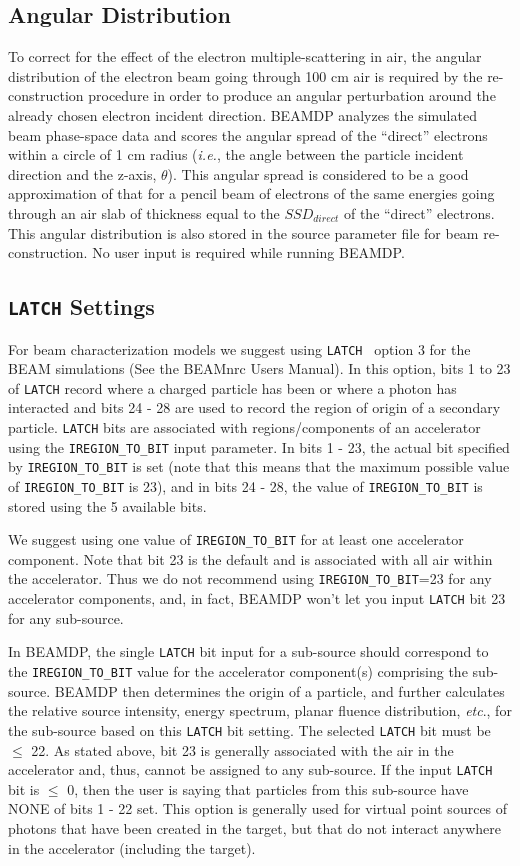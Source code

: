 \documentclass[12pt,twoside]{article}
\newcommand{\etc}{{\em etc}}
\newcommand{\ie}{{\em i.e.}}
\begin{document}
\subsection{Angular Distribution}
To correct for the effect of the electron multiple-scattering in air, the
angular distribution of the electron beam going through 100 cm air is
required by the re-construction procedure in order to produce an angular
perturbation around the already chosen electron incident direction. BEAMDP
analyzes the simulated beam phase-space data and scores the angular
spread  of the ``direct'' electrons within a circle of 1 cm radius (\ie,
the angle between the particle incident direction and the z-axis,
$\theta$). This angular spread is considered to be a good approximation of
that for a pencil beam of electrons of the same energies going through an
air slab of thickness equal to the $SSD_{direct}$ of the ``direct''
electrons. This angular distribution is also stored in the source
parameter file for beam re-construction.  No user input is required while
running BEAMDP.

\subsection{{\tt LATCH} Settings}
For beam characterization models we suggest using {\tt LATCH } option 3
for the BEAM simulations (See the BEAMnrc Users Manual\cite{Ro04a}).
In this option, bits 1 to 23 of {\tt LATCH} record where a charged particle
has been or where a photon has interacted and bits 24 - 28 are used to record
the region of origin of a secondary particle.  {\tt LATCH} bits are associated
with
regions/components of an accelerator using the {\tt IREGION\_TO\_BIT}
input parameter.  In bits 1 - 23, the actual bit specified by
{\tt IREGION\_TO\_BIT} is set (note that this means that the maximum
possible value of {\tt IREGION\_TO\_BIT} is 23), and in bits 24 - 28, the value of
{\tt IREGION\_TO\_BIT} is stored using the 5 available bits.

We suggest using one value of
{\tt IREGION\_TO\_BIT} for at
least one accelerator component.  Note that bit 23 is the default and
is associated with all air within the accelerator.  Thus we do not
recommend using {\tt IREGION\_TO\_BIT}=23 for any accelerator components, and,
in fact, BEAMDP won't let you input {\tt LATCH} bit 23 for any sub-source.

In BEAMDP, the single
{\tt LATCH} bit input for a sub-source should correspond to the
{\tt IREGION\_TO\_BIT} value for the accelerator component(s) comprising
the sub-source.  BEAMDP then determines the origin of a particle, and further
calculates the relative source
intensity, energy spectrum, planar fluence distribution, \etc., for the
sub-source based on this {\tt LATCH} bit setting.  The selected {\tt LATCH}
bit must be $\leq$ 22.  As stated
above, bit 23 is generally associated with the air in the accelerator and,
thus, cannot be assigned to any sub-source.  If the input
{\tt LATCH} bit is $\leq$ 0, then the user is saying that particles
from this sub-source have NONE of bits 1 - 22 set.  This option is
generally used for virtual point sources of photons that have been created
in the target, but that do not interact anywhere in the accelerator
(including the target).
\end{document}
